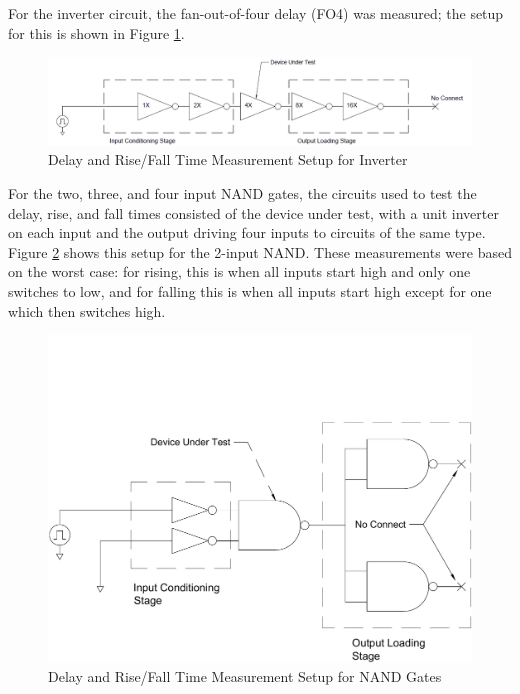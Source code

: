 \documentclass[12pt]{article}
\begin{document}
For the inverter circuit, the fan-out-of-four delay (FO4) was measured; the setup for this is shown in Figure \ref{fig:inv_delay_meas}.


\begin{figure}[H]
	\centering
	\includegraphics[width=\textwidth, keepaspectratio]{Graphics/INV_FO4}
	\caption{Delay and Rise/Fall Time Measurement Setup for Inverter}
	\label{fig:inv_delay_meas}
\end{figure}

For the two, three, and four input NAND gates, the circuits used to test the delay, rise, and fall times consisted of the device under test, with a unit inverter on each input and the output driving four inputs to circuits of the same type.
Figure \ref{fig:nand_delay_meas} shows this setup for the 2-input NAND.
These measurements were based on the worst case: for rising, this is when all inputs start high and only one switches to low, and for falling this is when all inputs start high except for one which then switches high.

\begin{figure}[H]
	\centering
	\includegraphics[width=\textwidth, keepaspectratio]{Graphics/NAND_FO4}
	\caption{Delay and Rise/Fall Time Measurement Setup for NAND Gates}
	\label{fig:nand_delay_meas}
\end{figure}
\end{document}

